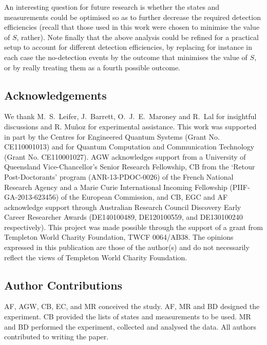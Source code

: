 \documentclass[aps,prl,floatfix,twocolumn,tightenlines,amsmath,amssymb,nofootinbib]{revtex4-1}
\begin{document}
An interesting question for future research is whether the states and measurements could be optimised so as to further decrease the required detection efficiencies (recall that those used in this work were chosen to minimise the value of $S$, rather). 
Note finally that the above analysis could be refined for a practical setup to account for different detection efficiencies, by replacing for instance in each case the no-detection events by the outcome that minimises the value of $S$, or by really treating them as a fourth possible outcome.


\subsection{Acknowledgements}
We thank M.~S.~Leifer, J.~Barrett, O.~J.~E.~Maroney and R.~Lal for insightful discussions and R. Mu\~noz for experimental assistance. This work was supported in part by the Centres for Engineered Quantum Systems (Grant No. CE110001013) and for Quantum Computation and Communication Technology (Grant No. CE110001027). AGW acknowledges support from a University of Queensland Vice-Chancellor's Senior Research Fellowship, CB from the `Retour Post-Doctorants' program (ANR-13-PDOC-0026) of the French National Research Agency and a Marie Curie International Incoming Fellowship (PIIF-GA-2013-623456) of the European Commission, and CB, EGC and AF acknowledge support through Australian Research Council Discovery Early Career Researcher Awards (DE140100489, DE120100559, and DE130100240 respectively). This project was made possible through the support of a grant from Templeton World Charity Foundation, TWCF 0064/AB38.  The opinions expressed in this publication are those of the author(s) and do not necessarily reflect the views of Templeton World Charity Foundation.

\subsection{Author Contributions} 
AF, AGW, CB, EC, and MR conceived the study. AF, MR and BD designed the experiment. CB provided the lists of states and measurements to be used. MR and BD performed the experiment, collected and analysed the data. All authors contributed to writing the paper.
\end{document}
